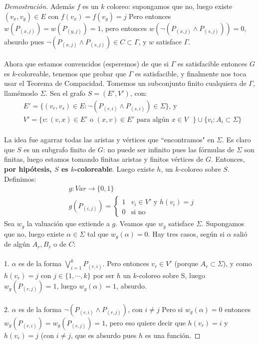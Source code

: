 \documentclass[12pt]{article}
\newenvironment{dem}{\begin{proof}[Demostración]}{\end{proof}}
\begin{document}
\begin{dem}
Además $f$ es un $k$ coloreo: supongamos que no, luego existe $(v_x,v_y) \in E$ con $f(v_x) = f(v_y) = j$ Pero entonces $w(P_{(x,j)}) = w(P_{(y,j)}) = 1$, pero entonces $w(\neg(P_{(x,j)} \land P_{(s,j)})) = 0$, absurdo pues $\neg(P_{(x,j)} \land P_{(s,j)}) \in C \subset \Gamma$, y $w$ satisface $\Gamma$. 
\\ \\
Ahora que estamos convencidos (esperemos) de que si $\Gamma$ es satisfacible entonces $G$ es $k$-coloreable, tenemos que probar que $\Gamma$ es satisfacible, y finalmente nos toca usar el Teorema de Compacidad. Tomemos un subconjunto finito cualquiera de $\Gamma$, llamémoslo $\Sigma$. Sea el grafo $S = (E', V')$, con:
\begin{align*}
&E' = \{ (v_r, v_s) \in E : \neg(P_{(r,i)} \land P_{(s,i)}) \in \Sigma \} \text{, y}\\
&V' = \{ v : (v, x) \in E' \text{ o } (x, v)\in E' \text{ para algún $x \in V$ } \} \cup \{ v_i : A_i \subset \Sigma \}
\end{align*}
\\
La idea fue agarrar todas las aristas y vértices que ``encontramos" en $\Sigma$. Es claro que $S$ es un subgrafo finito de $G$: no puede ser infinito pues las fórmulas de $\Sigma$ son finitas, luego estamos tomando finitas aristas y finitos vértices de $G$. Entonces, \textbf{por hipótesis, $S$ es $k$-coloreable}. Luego existe $h$, un $k$-coloreo sobre $S$. Definimos:
\begin{align*}
&g : Var \rightarrow \{0,1 \} \\
&g(P_{(i,j)}) = \begin{cases} 
      1 & v_i \in V' \text{ y } h(v_i) = j \\
      0 & \text{si no}
      \end{cases}
\end{align*}
Sea $w_g$ la valuación que extiende a $g$. Veamos que $w_g$ satisface $\Sigma$. Supongamos que no, luego existe $\alpha \in \Sigma$ tal que $w_g(\alpha) = 0$. Hay tres casos, según si $\alpha$ salió de algún $A_r, B_r$ o de $C$:
\\ \\ 1. $\alpha$ es de la forma $\bigvee_{i=1}^{k}P_{(r,i)}$. Pero entonces $v_r \in V'$ (porque $A_r \subset \Sigma$), y como $h(v_r) = j$ con $j \in \{1, \cdots, k\}$ por ser $h$ un $k$-coloreo sobre S, luego $w_g(P_{(r,j)}) = 1$, luego $w_g(\alpha) = 1$, absurdo.
\\ \\2. $\alpha$ es de la forma $\neg(P_{(r,i)}\land P_{(r,j)})$, con $i \neq j$ Pero si $w_g(\alpha) = 0$ entonces $w_g(P_{(r,i)}) = w_g(P_{(r,j)}) = 1$, pero eso quiere decir que $h(v_r) = i$ y $h(v_r) = j$ (con $i \neq j$, que es absurdo pues $h$ es una función.

\end{dem}
\end{document}

